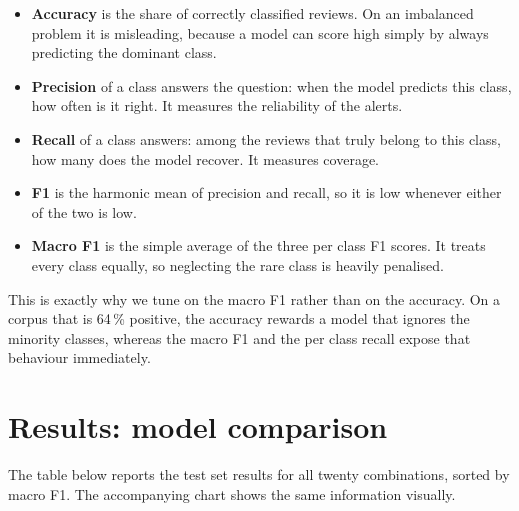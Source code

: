 \documentclass[11pt,a4paper]{article}
\begin{document}
\begin{itemize}[leftmargin=1.4em]
\item \textbf{Accuracy} is the share of correctly classified reviews. On an
imbalanced problem it is misleading, because a model can score high simply by always
predicting the dominant class.
\item \textbf{Precision} of a class answers the question: when the model predicts this
class, how often is it right. It measures the reliability of the alerts.
\item \textbf{Recall} of a class answers: among the reviews that truly belong to this
class, how many does the model recover. It measures coverage.
\item \textbf{F1} is the harmonic mean of precision and recall, so it is low whenever
either of the two is low.
\item \textbf{Macro F1} is the simple average of the three per class F1 scores. It
treats every class equally, so neglecting the rare class is heavily penalised.
\end{itemize}

This is exactly why we tune on the macro F1 rather than on the accuracy. On a corpus
that is 64\,\% positive, the accuracy rewards a model that ignores the minority
classes, whereas the macro F1 and the per class recall expose that behaviour
immediately.

\section{Results: model comparison}
The table below reports the test set results for all twenty combinations, sorted by
macro F1. The accompanying chart shows the same information visually.
\end{document}
